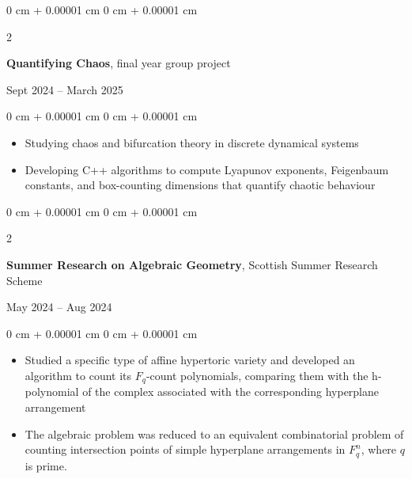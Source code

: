 \documentclass[10pt, a4paper]{article}
\newenvironment{highlights}{
    \begin{itemize}[
        topsep=0.10 cm,
        parsep=0.10 cm,
        partopsep=0pt,
        itemsep=0pt,
        leftmargin=0 cm + 10pt
    ]
}{
    \end{itemize}
} %
\newenvironment{onecolentry}{
    \begin{adjustwidth}{
        0 cm + 0.00001 cm
    }{
        0 cm + 0.00001 cm
    }
}{
    \end{adjustwidth}
} %
\newenvironment{twocolentry}[2][]{
    \onecolentry
    \def\secondColumn{#2}
    \setcolumnwidth{\fill, 4.5 cm}
    \begin{paracol}{2}
}{
    \switchcolumn \raggedleft \secondColumn
    \end{paracol}
    \endonecolentry
} %
\begin{document}
		\vspace{0.15 cm}

		\begin{twocolentry}{
	            Sept 2024 – March 2025
	        }
				\textbf{Quantifying Chaos}, final year group project
			\end{twocolentry}
	        \vspace{0.10 cm}
	        \begin{onecolentry}
	            \begin{highlights}
	                \item Studying chaos and bifurcation theory in discrete dynamical systems
					\item Developing C++ algorithms to compute Lyapunov exponents, Feigenbaum constants, and box-counting dimensions that quantify chaotic behaviour
	            \end{highlights}
	        \end{onecolentry}

		\vspace{0.15 cm}

		\begin{twocolentry}{
	            May 2024 – Aug 2024
	        }
				\textbf{Summer Research on Algebraic Geometry}, Scottish Summer Research Scheme 
			\end{twocolentry}
	        \vspace{-0.30 cm}
	        \begin{onecolentry}
	            \begin{highlights}
	                \item Studied a specific type of affine hypertoric variety and developed an algorithm to count its $F_q$-count polynomials, comparing them with the h-polynomial of the complex associated with the corresponding hyperplane arrangement
					\item The algebraic problem was reduced to an equivalent combinatorial problem of counting intersection points of simple hyperplane arrangements in $F^n_q$, where $q$ is prime.
	            \end{highlights}
	        \end{onecolentry}
\end{document}
